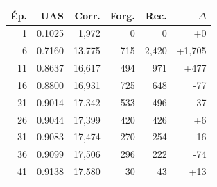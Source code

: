 \begin{table}[ht]
\hfill
\begin{minipage}[t]{0.42\linewidth}
\centering\tiny
\begin{tabular}{rrrrrr}
\toprule
\textbf{Ép.} & \textbf{UAS} & \textbf{Corr.} & \textbf{Forg.} & \textbf{Rec.} & \textbf{$\Delta$} \\
\midrule
1 & 0.1025 & 1,972 & 0 & 0 & +0 \\
6 & 0.7160 & 13,775 & 715 & 2,420 & +1,705 \\
11 & 0.8637 & 16,617 & 494 & 971 & +477 \\
16 & 0.8800 & 16,931 & 725 & 648 & -77 \\
21 & 0.9014 & 17,342 & 533 & 496 & -37 \\
26 & 0.9044 & 17,399 & 420 & 426 & +6 \\
31 & 0.9083 & 17,474 & 270 & 254 & -16 \\
36 & 0.9099 & 17,506 & 296 & 222 & -74 \\
41 & 0.9138 & 17,580 & 30 & 43 & +13 \\
\bottomrule
\end{tabular}
\end{minipage}
\end{table}
